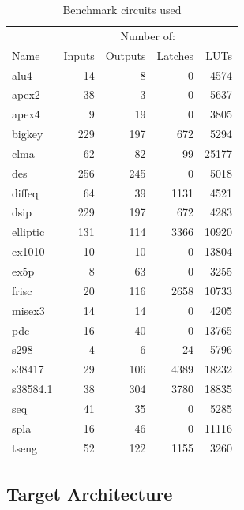 \documentclass[12pt,final,oneside]{dwThesis} %
\begin{document}
   \begin{table} \begin{center} \begin{tabular}{lrrrr} \toprule &
            \multicolumn{4}{c}{Number of:}\\ \cmidrule{2-5} Name & Inputs &
            Outputs & Latches & \glspl{LUT}\\ \midrule alu4 & 14 & 8 & 0 &
            4574\\ apex2 & 38 & 3 & 0 & 5637\\ apex4 & 9 & 19 & 0 & 3805\\
            bigkey & 229 & 197 & 672 & 5294\\ clma & 62 & 82 & 99 & 25177\\ des
            & 256 & 245 & 0 & 5018\\ diffeq & 64 & 39 & 1131 & 4521\\ dsip &
            229 & 197 & 672 & 4283\\ elliptic & 131 & 114 & 3366 & 10920\\
            ex1010 & 10 & 10 & 0 & 13804\\ ex5p & 8 & 63 & 0 & 3255\\ frisc &
            20 & 116 & 2658 & 10733\\ misex3 & 14 & 14 & 0 & 4205\\ pdc & 16 &
            40 & 0 & 13765\\ s298     & 4 & 6 & 24 & 5796\\ s38417   & 29 & 106
            & 4389 & 18232\\ s38584.1 & 38 & 304 & 3780 & 18835\\ seq      & 41
            & 35 & 0 & 5285\\ spla     & 16 & 46 & 0 & 11116\\ tseng    & 52 &
            122 & 1155 & 3260\\ \bottomrule \end{tabular} \caption{Benchmark
            circuits used} \label{benchmarkList} \end{center}
   \end{table} \subsection{Target
      Architecture} \begin{figure} \begin{center}

\end{center}
\end{figure}
\end{document}
